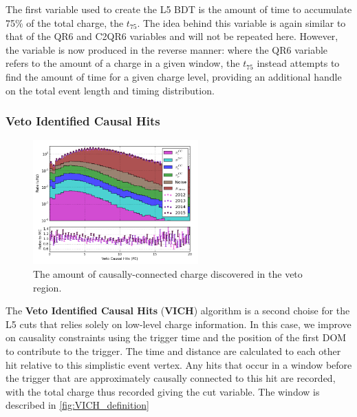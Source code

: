The first variable used to create the L5 BDT is the amount of time to accumulate 75\% of the total charge, the \textbf{$t_{75}$}. 
The idea behind this variable is again similar to that of the QR6 and C2QR6 variables and will not be repeated here.
However, the variable is now produced in the reverse manner: where the QR6 variable refers to the amount of a charge in a given window, the $t_{75}$ instead attempts to find the amount of time for a given charge level, providing an additional handle on the total event length and timing distribution.


\subsubsection{Veto Identified Causal Hits}
\begin{figure}[h]
	\centering
		\includegraphics[width=2.5in]{Veto_Causal_Hits_(PE)_log.png}
		\caption[Veto Identified Causal Hits]{The amount of causally-connected charge discovered in the veto region.}
	\label{fig:vich}
\end{figure}

The \textbf{Veto Identified Causal Hits} (\textbf{VICH}) algorithm is a second choise for the L5 cuts that relies solely on low-level charge information.
In this case, we improve on causality constraints using the trigger time and the position of the first DOM to contribute to the trigger.
The time and distance are calculated to each other hit relative to this simplistic event vertex.
Any hits that occur in a window before the trigger that are approximately causally connected to this hit are recorded, with the total charge thus recorded giving the cut variable.
The window is described in \ref{fig:VICH_definition}


